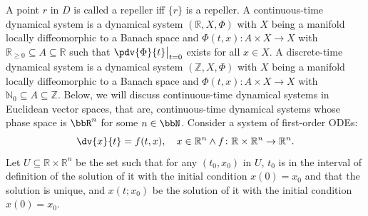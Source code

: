 \documentclass[a4paper,12pt]{report}
\begin{document}
\eit
A point $r$ in $D$ is called a repeller iff $\{r\}$ is a repeller.
A continuous-time dynamical system is a dynamical system $(\mathbb{R}, X, \Phi)$ with $X$ being a manifold locally diffeomorphic to a Banach space and $\Phi(t,x)\colon A\times X\to X$ with $\mathbb{R}_{\geq 0}\subseteq A\subseteq\mathbb{R}$ such that $\pdv{\Phi}{t}\big\vert_{t=0}$ exists for all $x\in X$.
A discrete-time dynamical system is a dynamical system $(\mathbb{Z}, X, \Phi)$ with $X$ being a manifold locally diffeomorphic to a Banach space and $\Phi(t,x)\colon A\times X\to X$ with $\mathbb{N}_0\subseteq A\subseteq\mathbb{Z}$.
Below, we will discuss continuous-time dynamical systems in Euclidean vector spaces, that are, continuous-time dynamical systems whose phase space is $\bbR^n$ for some $n\in\bbN$.
Consider a system of first-order ODEs:
\[\dv{x}{t}=f(t,x), \quad x\in\mathbb{R}^n\land f\colon\mathbb{R}\times\mathbb{R}^n\to\mathbb{R}^n.\]
Let $U\subseteq\mathbb{R}\times\mathbb{R}^n$ be the set such that for any $(t_0,x_0)$ in $U$, $t_0$ is in the interval of definition of the solution of it with the initial condition $x(0)=x_0$ and that the solution is unique, and $x(t;x_0)$ be the solution of it with the initial condition $x(0)=x_0$.
\end{document}
